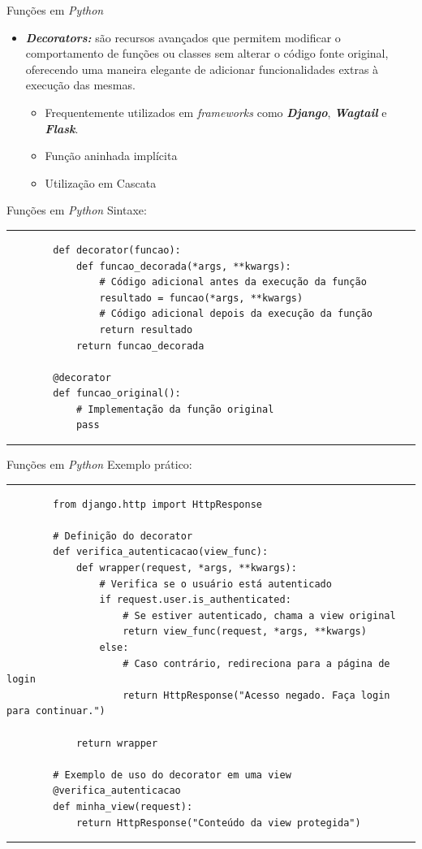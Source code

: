 \documentclass{beamer}
\begin{document}
\begin{frame}{Funções em \textit{Python}}
	\label{decorators}
	\begin{itemize}
		\item \textbf{\textit{Decorators:}} são recursos avançados que permitem modificar o comportamento de funções ou classes sem alterar o código fonte original, oferecendo uma maneira elegante de adicionar funcionalidades extras à execução das mesmas.
		\begin{itemize}
			\item Frequentemente utilizados em \textit{frameworks} como \textit{\textbf{Django}}, \textit{\textbf{Wagtail}} e \textit{\textbf{Flask}}.
			\item Função aninhada implícita
			\item Utilização em Cascata
		\end{itemize}
	\end{itemize}
\end{frame}

\begin{frame}[fragile]{Funções em \textit{Python}}
	\label{decorators_sintaxe}
	Sintaxe:
	\rule{\textwidth}{1pt}
	\scriptsize
	\begin{verbatim}
		def decorator(funcao):
			def funcao_decorada(*args, **kwargs):
				# Código adicional antes da execução da função
				resultado = funcao(*args, **kwargs)
				# Código adicional depois da execução da função
				return resultado
			return funcao_decorada
		
		@decorator
		def funcao_original():
			# Implementação da função original
			pass
	\end{verbatim}
	\rule{\textwidth}{1pt}
\end{frame}

\begin{frame}[fragile]{Funções em \textit{Python}}
\label{decorators_exemplo}
Exemplo prático:
\rule{\textwidth}{1pt}
\scriptsize
\begin{verbatim}
		from django.http import HttpResponse
		
		# Definição do decorator
		def verifica_autenticacao(view_func):
			def wrapper(request, *args, **kwargs):
				# Verifica se o usuário está autenticado
				if request.user.is_authenticated:
					# Se estiver autenticado, chama a view original
					return view_func(request, *args, **kwargs)
				else:
					# Caso contrário, redireciona para a página de login
					return HttpResponse("Acesso negado. Faça login para continuar.")
			
			return wrapper
			
		# Exemplo de uso do decorator em uma view
		@verifica_autenticacao
		def minha_view(request):
			return HttpResponse("Conteúdo da view protegida")
\end{verbatim}
\rule{\textwidth}{1pt}
\end{frame}
\end{document}
